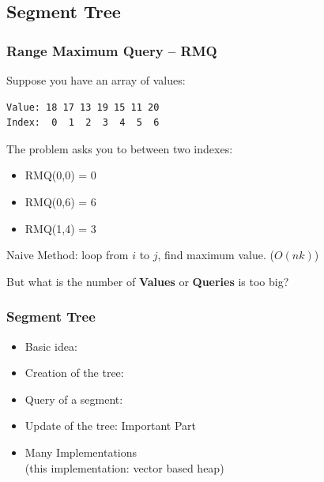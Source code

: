 \documentclass{beamer}
\begin{document}
\subsection{Segment Tree}
\begin{frame}[fragile]
  \frametitle{Range Maximum Query -- RMQ}

  Suppose you have an array of values:
\begin{verbatim}
Value: 18 17 13 19 15 11 20
Index:  0  1  2  3  4  5  6
\end{verbatim}

\bigskip

The  problem asks you to  between two indexes:

\begin{itemize}
  \item RMQ(0,0) = 0
  \item RMQ(0,6) = 6
  \item RMQ(1,4) = 3
\end{itemize}

\bigskip

\alert{Naive Method:} loop from $i$ to $j$, find maximum value. ($O(nk)$)\\
\medskip

But what is the number of {\bf Values} or {\bf Queries} is too big?
\end{frame}

\begin{frame}
  \frametitle{Segment Tree}

  \begin{itemize}
    \item Basic idea: 
    \bigskip

    \item Creation of the tree: 
    \bigskip

    \item Query of a segment: 
    \bigskip

    \item Update of the tree:  \hfill \alert{Important Part}
    \bigskip

    \item Many Implementations\\(this implementation: vector based heap)
  \end{itemize}
\end{frame}
\end{document}
